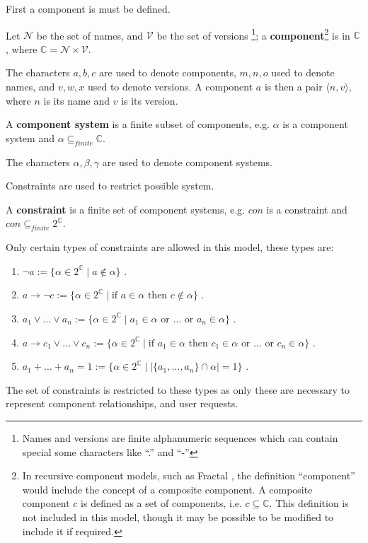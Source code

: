 First a component is must be defined.
\begin{defs}
\label{formal.componentdef}
Let $\mathcal{N}$ be the set of names, and $\mathcal{V}$ be the set of versions \footnote{Names and versions are finite alphanumeric sequences which can contain special some characters like ``.'' and ``-''}; 
a \textbf{component}\footnote{In recursive component models, such as Fractal \citep{Quma2006}, the definition ``component'' would include the concept of a composite component.
A composite component $c$ is defined as a set of components, i.e. $c \subseteq \mathbb{C}$.
This definition is not included in this model, though it may be possible to be modified to include it if required.} 
is in $\mathbb{C}$, where $\mathbb{C} = \mathcal{N} \times \mathcal{V}$. 
\end{defs}
The characters  $a,b,c$ are used to denote components, $m,n,o$ used to denote names, and $v,w,x$ used to denote versions.
A component $a$ is then a pair $\langle n,v \rangle$, where $n$ is its name and $v$ is its version.

\begin{defs}
\label{formal.componentsystemdef}
A \textbf{component system} is a finite subset of components, e.g. $\alpha$ is a component system and $\alpha \subseteq_{finite} \mathbb{C}$. 
\end{defs}
The characters $\alpha,\beta,\gamma$ are used to denote component systems.

Constraints are used to restrict possible system.
\begin{defs}
\label{formal.constraintdefs}
A \textbf{constraint} is a finite set of component systems, e.g. $con$ is a constraint and $con \subseteq_{finite} 2^{\mathbb{C}}$.
\end{defs}

Only certain types of constraints are allowed in this model, these types are:
\begin{enumerate}
  \item $\neg a := \{\alpha \in 2^{\mathbb{C}} \mid a \not \in \alpha \}$ \label{formal.removeconstraint}.
  \item $a \rightarrow \neg c := \{\alpha \in 2^{\mathbb{C}} \mid \mbox{if } a \in \alpha \mbox{ then } c \not \in \alpha\}$ \label{formal.conflictconstraint}.
  \item $a_1 \vee \ldots \vee a_n := \{\alpha \in 2^{\mathbb{C}} \mid a_1 \in \alpha \mbox{ or }\ldots \mbox{ or } a_n \in \alpha\}$ \label{formal.keepconstraint}.
  \item $a \rightarrow c_1 \vee \ldots \vee c_n := \{\alpha \in 2^{\mathbb{C}} \mid \mbox{if } a_1 \in \alpha \mbox{ then }  c_1 \in \alpha \mbox{ or } \ldots \mbox{ or } c_n \in \alpha\}$ \label{formal.dependencyconstraint}.
  \item $a_1 + \ldots + a_n = 1 := \{\alpha \in 2^{\mathbb{C}} \mid |\{a_1,\ldots,a_n\} \cap \alpha| = 1\}$ \label{formal.upgradeconstraint}.
\end{enumerate}
The set of constraints is restricted to these types as only these are necessary to represent component relationships, and user requests. 

